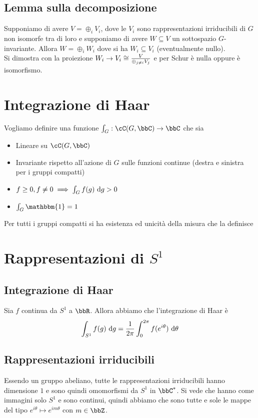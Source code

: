 \documentclass[a4paper,NoNotes,GeneralMath]{stdmdoc}
\begin{document}
	\subsection{Lemma sulla decomposizione}
	Supponiamo di avere $V = \oplus_i V_i$, dove le $V_i$ sono rappresentazioni irriducibili di $G$ non isomorfe tra di loro e supponiamo di avere $W \subseteq V$ un sottospazio $G$-invariante. Allora $W = \oplus_i W_i$ dove si ha $W_i \subseteq V_i$ (eventualmente nullo). \\
	Si dimostra con la proiezione $W_i \rightarrow V_i \cong \frac{V}{\oplus_{j \neq i} V_j}$ e per Schur è nulla oppure è isomorfismo.
	
	\section{Integrazione di Haar}
	Vogliamo definire una funzione $\int_G: \cC(G, \bbC) \rar \bbC$ che sia
	\begin{itemize}
		\item Lineare su $\cC(G, \bbC)$
		\item Invariante rispetto all'azione di $G$ sulle funzioni continue (destra e sinistra per i gruppi compatti)
		\item $f \ge 0, f \neq 0 \implies \int_G f(g) \de g > 0$
		\item $\int_G \mathbbm{1} = 1$
	\end{itemize}
	Per tutti i gruppi compatti si ha esistenza ed unicità della misura che la definisce
	
	\section{Rappresentazioni di $S^1$}
	\subsection{Integrazione di Haar}
	Sia $f$ continua da $S^1$ a $\bbR$. Allora abbiamo che l'integrazione di Haar è
	$$ \int_{S^1} f(g) \de g = \frac{1}{2 \pi} \int_{0}^{2\pi} f(e^{i\theta}) \de \theta $$
	
	\subsection{Rappresentazioni irriducibili}
	Essendo un gruppo abeliano, tutte le rappresentazioni irriducibili hanno dimensione $1$ e sono quindi omomorfismi da $S^1$ in $\bbC^{*}$. Si vede che hanno come immagini solo $S^1$ e sono continui, quindi abbiamo che sono tutte e sole le mappe del tipo $e^{i\theta} \mapsto e^{im\theta}$ con $m \in \bbZ$.
	
\end{document}
